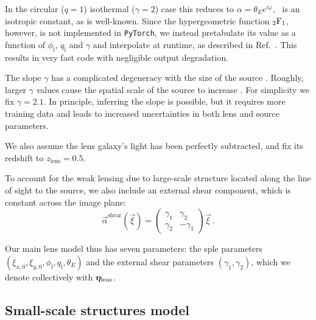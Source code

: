 In the circular ($q=1$) isothermal ($\gamma=2$) case this reduces to $\alpha=\theta_E e^{i\varphi}$, \ie~is an isotropic constant, as is well-known. Since the hypergeometric function ${}_2\mathrm{F}_1$, however, is not implemented in \texttt{PyTorch}, we instead pretabulate its value as a function of $\phi_\mathrm{l}$, $q_\mathrm{l}$ and $\gamma$ and interpolate at runtime, as described in Ref.~\cite{Chianese:2019ifk}. This results in very fast code with negligible output degradation.

The slope $\gamma$ has a complicated degeneracy with the size of the source \cite{Schneider:2013sxa,Schneider:2013wga}. Roughly, larger $\gamma$ values cause the spatial scale of the source to increase \cite[Section 3.3]{Nightingale:2014aa}. For simplicity we fix $\gamma = 2.1$. In principle, inferring the slope is possible, but it requires more training data and leads to increased uncertainties in both lens and source parameters.

We also assume the lens galaxy's light has been perfectly subtracted, and fix its redshift to $z_\mathrm{lens} = 0.5$.

To account for the weak lensing due to large-scale structure located along the line of sight to the source, we also include an external shear component, which is constant across the image plane:
\begin{equation}
    \vec{\alpha}^\mathrm{shear}(\vec{\xi}) = \begin{pmatrix} \gamma_1 & \gamma_2 \\ \gamma_2 & -\gamma_1 \end{pmatrix} \vec{\xi} \, .
\end{equation}

Our main lens model thus has seven parameters: the \gls*{sple} parameters $(\xi_{x, 0}, \xi_{y, 0}, \phi_\mathrm{l}, q_\mathrm{l}, \theta_E)$ and the external shear parameters $(\gamma_1, \gamma_2)$, which we denote collectively with $\bm{\eta}_\mathrm{lens}$.

\subsection{Small-scale structures model} \label{subsec:substructure}

